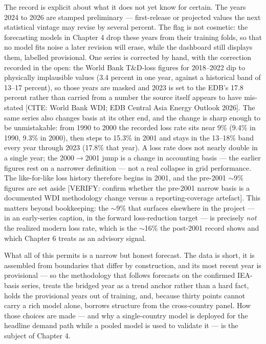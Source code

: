 \documentclass[10pt,twocolumn]{article}
\newcommand{\mk}[1]{{\color{amber}\small #1}}
\begin{document}
The record is explicit about what it does not yet know for certain. The years 2024 to 2026 are stamped preliminary --- first-release or projected values the next statistical vintage may revise by several percent. The flag is not cosmetic: the forecasting models in Chapter 4 drop these years from their training folds, so that no model fits noise a later revision will erase, while the dashboard still displays them, labelled provisional. One series is corrected by hand, with the correction recorded in the open: the World Bank T\&D-loss figures for 2018--2022 dip to physically implausible values (3.4 percent in one year, against a historical band of 13--17 percent), so those years are masked and 2023 is set to the EDB's 17.8 percent rather than carried from a number the source itself appears to have mis-stated \mk{[CITE: World Bank WDI; EDB Central Asia Energy Outlook 2026]}. The same series also changes basis at its other end, and the change is sharp enough to be unmistakable: from 1990 to 2000 the recorded loss rate sits near 9\% (9.4\% in 1990, 9.3\% in 2000), then steps to 15.3\% in 2001 and stays in the 13--18\% band every year through 2023 (17.8\% that year). A loss rate does not nearly double in a single year; the 2000$\rightarrow$2001 jump is a change in accounting basis --- the earlier figures rest on a narrower definition --- not a real collapse in grid performance. The like-for-like loss history therefore begins in 2001, and the pre-2001 $\sim$9\% figures are set aside \mk{[VERIFY: confirm whether the pre-2001 narrow basis is a documented WDI methodology change versus a reporting-coverage artefact]}. This matters beyond bookkeeping: the $\sim$9\% that surfaces elsewhere in the project --- in an early-series caption, in the forward loss-reduction target --- is precisely \textit{not} the realized modern loss rate, which is the $\sim$16\% the post-2001 record shows and which Chapter 6 treats as an advisory signal.

What all of this permits is a narrow but honest forecast. The data is short, it is assembled from boundaries that differ by construction, and its most recent year is provisional --- so the methodology that follows forecasts on the confirmed IEA-basis series, treats the bridged year as a trend anchor rather than a hard fact, holds the provisional years out of training, and, because thirty points cannot carry a rich model alone, borrows structure from the cross-country panel. How those choices are made --- and why a single-country model is deployed for the headline demand path while a pooled model is used to validate it --- is the subject of Chapter 4.
\end{document}
